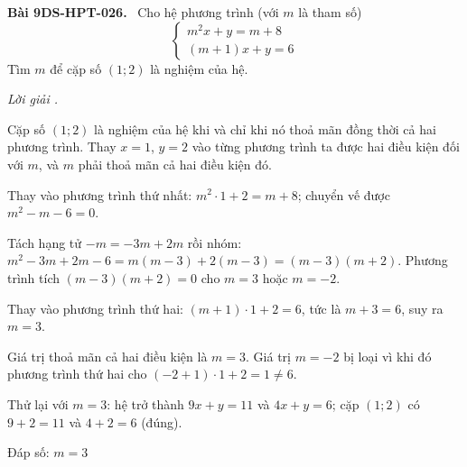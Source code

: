 \documentclass[12pt,a4paper]{article}
\newenvironment{problem}[1][]{\par\medskip\noindent\textbf{Bài #1.}\ }{\par}
\newenvironment{solution}[1][]{\par\noindent\textit{Lời giải #1.}\par}{\par}
\begin{document}
\begin{problem}[9DS-HPT-026]
Cho hệ phương trình (với $m$ là tham số)
\[ \begin{cases} m^2x + y = m + 8 \\ (m + 1)x + y = 6 \end{cases} \]
Tìm $m$ để cặp số $(1; 2)$ là nghiệm của hệ.

\begin{solution}
Cặp số $(1; 2)$ là nghiệm của hệ khi và chỉ khi nó thoả mãn đồng thời cả hai phương trình. Thay $x = 1$, $y = 2$ vào từng phương trình ta được hai điều kiện đối với $m$, và $m$ phải thoả mãn cả hai điều kiện đó.

Thay vào phương trình thứ nhất: $m^2 \cdot 1 + 2 = m + 8$; chuyển vế được $m^2 - m - 6 = 0$.

Tách hạng tử $-m = -3m + 2m$ rồi nhóm: $m^2 - 3m + 2m - 6 = m(m - 3) + 2(m - 3) = (m - 3)(m + 2)$. Phương trình tích $(m - 3)(m + 2) = 0$ cho $m = 3$ hoặc $m = -2$.

Thay vào phương trình thứ hai: $(m + 1) \cdot 1 + 2 = 6$, tức là $m + 3 = 6$, suy ra $m = 3$.

Giá trị thoả mãn cả hai điều kiện là $m = 3$. Giá trị $m = -2$ bị loại vì khi đó phương trình thứ hai cho $(-2 + 1) \cdot 1 + 2 = 1 \neq 6$.

Thử lại với $m = 3$: hệ trở thành $9x + y = 11$ và $4x + y = 6$; cặp $(1; 2)$ có $9 + 2 = 11$ và $4 + 2 = 6$ (đúng).

Đáp số: $\boxed{m = 3}$
\end{solution}
\end{problem}
\end{document}
